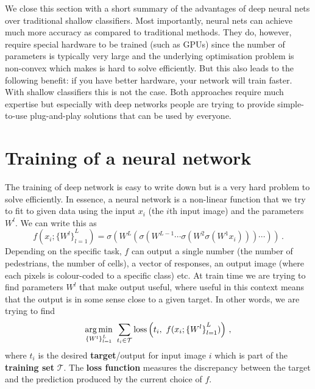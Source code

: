 We close this section with a short summary of the advantages of deep neural nets
over traditional shallow classifiers. Most importantly, neural nets can achieve
much more accuracy as compared to traditional methods. They do, however, require
special hardware to be trained (such as GPUs) since the number of parameters is
typically very large and the underlying optimisation problem is non-convex which
makes is hard to solve efficiently. But this also leads to the following
benefit: if you have better hardware, your network will train faster. With
shallow classifiers this is not the case. Both approaches require much expertise
but especially with deep networks people are trying to provide simple-to-use
plug-and-play solutions that can be used by everyone.

\section{Training of a neural network}
\label{sec:train-neur-netw}
The training of deep network is easy to write down but is a very hard problem to
solve efficiently. In essence, a neural network is a non-linear function that we
try to fit to given data using the input $x_i$ (the $i$th input image) and the
parameters $W^l$. We can write this as
\begin{equation*}
  f(x_i; {\{W^l\}}_{l=1}^L) = \sigma(W^L(\sigma(W^{L-1}\dotsm \sigma(W^2\sigma(W^1 x_i))) \dotsm ))\,.
\end{equation*}
Depending on the specific task, $f$ can output a single number (\eg the number
of pedestrians, the number of cells), a vector of responses, an output image
(\eg where each pixels is colour-coded to a specific class) etc. At train time
we are trying to find parameters $W^l$ that make output useful, where useful in
this context means that the output is in some sense close to a given target. In
other words, we are trying to find
\begin{equation*}
  \argmin_{{\{W^l\}}_{l=1}^L}\ \sum_{t_i \in \mathcal{T}} \loss\left(t_i,\ f(x_i; {\{W^l\}}_{l=1}^L)\right)\,,
\end{equation*}
where $t_i$ is the desired \textbf{target}/output for input image $i$ which is
part of the \textbf{training set} $\mathcal{T}$. The \textbf{loss function}
measures the discrepancy between the target and the prediction produced by the
current choice of $f$.

